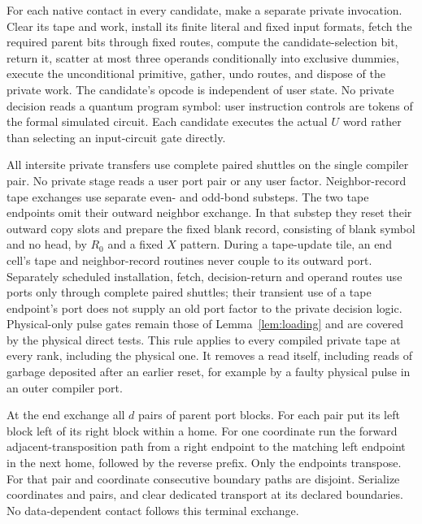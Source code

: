 For each native contact in every candidate, make a separate private invocation. Clear its tape and work, install its finite literal and fixed input formats, fetch the required parent bits through fixed routes, compute the candidate-selection bit, return it, scatter at most three operands conditionally into exclusive dummies, execute the unconditional primitive, gather, undo routes, and dispose of the private work. The candidate's opcode is independent of user state. No private decision reads a quantum program symbol: user instruction controls are tokens of the formal simulated circuit. Each candidate executes the actual $U$ word rather than selecting an input-circuit gate directly.

All intersite private transfers use complete paired shuttles on the single compiler pair. No private stage reads a user port pair or any user factor. Neighbor-record tape exchanges use separate even- and odd-bond substeps. The two tape endpoints omit their outward neighbor exchange. In that substep they reset their outward copy slots and prepare the fixed blank record, consisting of blank symbol and no head, by $R_0$ and a fixed $X$ pattern. During a tape-update tile, an end cell's tape and neighbor-record routines never couple to its outward port. Separately scheduled installation, fetch, decision-return and operand routes use ports only through complete paired shuttles; their transient use of a tape endpoint's port does not supply an old port factor to the private decision logic. Physical-only pulse gates remain those of Lemma~\ref{lem:loading} and are covered by the physical direct tests. This rule applies to every compiled private tape at every rank, including the physical one. It removes a read itself, including reads of garbage deposited after an earlier reset, for example by a faulty physical pulse in an outer compiler port.

At the end exchange all $d$ pairs of parent port blocks. For each pair put its left block left of its right block within a home. For one coordinate run the forward adjacent-transposition path from a right endpoint to the matching left endpoint in the next home, followed by the reverse prefix. Only the endpoints transpose. For that pair and coordinate consecutive boundary paths are disjoint. Serialize coordinates and pairs, and clear dedicated transport at its declared boundaries. No data-dependent contact follows this terminal exchange.


